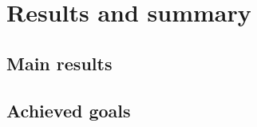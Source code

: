 \chapter{Results and summary}
\graphicspath{{Chapter5/Figs/}{Chapter5/Figs/}}


\section{Main results}
\label{chapter5-main-results}





\section{Achieved goals}
\label{chapter5-achieved-goals}

